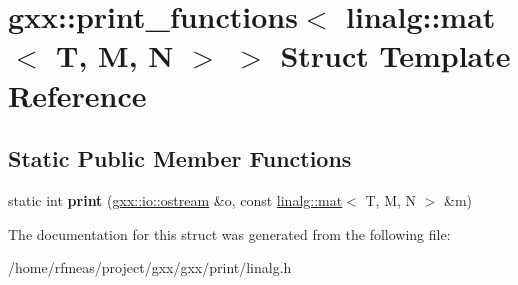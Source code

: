 \hypertarget{structgxx_1_1print__functions_3_01linalg_1_1mat_3_01T_00_01M_00_01N_01_4_01_4}{}\section{gxx\+:\+:print\+\_\+functions$<$ linalg\+:\+:mat$<$ T, M, N $>$ $>$ Struct Template Reference}
\label{structgxx_1_1print__functions_3_01linalg_1_1mat_3_01T_00_01M_00_01N_01_4_01_4}
\subsection*{Static Public Member Functions}
\begin{DoxyCompactItemize}
\item 
static int {\bfseries print} (\hyperlink{classgxx_1_1io_1_1ostream}{gxx\+::io\+::ostream} \&o, const \hyperlink{structlinalg_1_1mat}{linalg\+::mat}$<$ T, M, N $>$ \&m)\hypertarget{structgxx_1_1print__functions_3_01linalg_1_1mat_3_01T_00_01M_00_01N_01_4_01_4_ac6a84031013f43d058e91a1831a67932}{}\label{structgxx_1_1print__functions_3_01linalg_1_1mat_3_01T_00_01M_00_01N_01_4_01_4_ac6a84031013f43d058e91a1831a67932}

\end{DoxyCompactItemize}


The documentation for this struct was generated from the following file\+:\begin{DoxyCompactItemize}
\item 
/home/rfmeas/project/gxx/gxx/print/linalg.\+h\end{DoxyCompactItemize}
